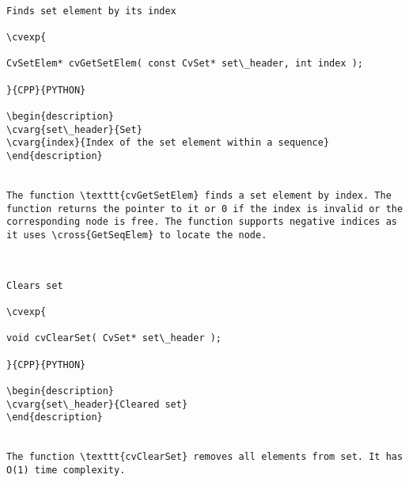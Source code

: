 \begin{verbatim}

Finds set element by its index

\cvexp{

CvSetElem* cvGetSetElem( const CvSet* set\_header, int index );

}{CPP}{PYTHON}

\begin{description}
\cvarg{set\_header}{Set}
\cvarg{index}{Index of the set element within a sequence}
\end{description}


The function \texttt{cvGetSetElem} finds a set element by index. The function returns the pointer to it or 0 if the index is invalid or the corresponding node is free. The function supports negative indices as it uses \cross{GetSeqElem} to locate the node.


\end{verbatim}
\begin{verbatim}

Clears set

\cvexp{

void cvClearSet( CvSet* set\_header );

}{CPP}{PYTHON}

\begin{description}
\cvarg{set\_header}{Cleared set}
\end{description}


The function \texttt{cvClearSet} removes all elements from set. It has O(1) time complexity.


\end{verbatim}
